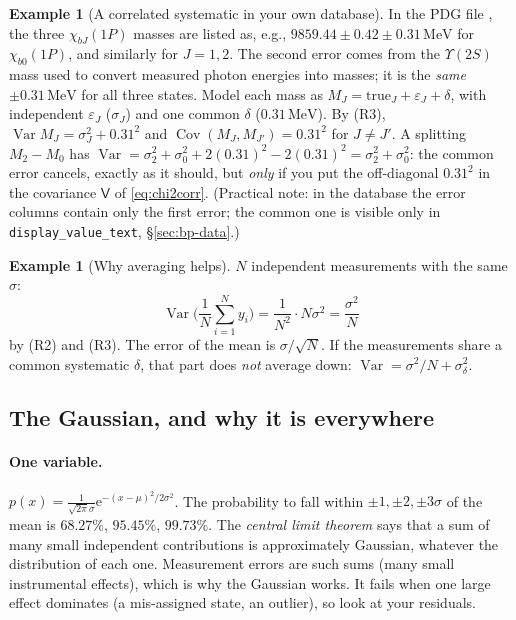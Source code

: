 \documentclass[11pt,a4paper]{article}
\numberwithin{equation}{section}
\theoremstyle{definition}
\newtheorem{example}[definition]{Example}
\theoremstyle{plain}
\theoremstyle{remark}
\numberwithin{algorithm}{section}
\newcommand{\ee}{\mathrm{e}}
\newcommand{\MeV}{\,\mathrm{MeV}}
\newcommand{\sV}{\mathsf V}
\begin{document}
\begin{example}[A correlated systematic in your own database]\label{ex:chib}
In the PDG file , the three $\chi_{bJ}(1P)$ masses are listed as, e.g., $9859.44\pm0.42\pm0.31\MeV$ for $\chi_{b0}(1P)$, and similarly for $J=1,2$. The second error comes from the $\Upsilon(2S)$ mass used to convert measured photon energies into masses; it is the \emph{same} $\pm0.31\MeV$ for all three states. Model each mass as $M_J=\text{true}_J+\varepsilon_J+\delta$, with independent $\varepsilon_J$ ($\sigma_J$) and one common $\delta$ ($0.31\MeV$). By (R3), $\operatorname{Var}M_J=\sigma_J^2+0.31^2$ and $\operatorname{Cov}(M_J,M_{J'})=0.31^2$ for $J\ne J'$. A splitting $M_2-M_0$ has $\operatorname{Var}=\sigma_2^2+\sigma_0^2+2(0.31)^2-2(0.31)^2=\sigma_2^2+\sigma_0^2$: the common error cancels, exactly as it should, but \emph{only} if you put the off-diagonal $0.31^2$ in the covariance $\sV$ of \eqref{eq:chi2corr}. (Practical note: in the database the error columns contain only the first error; the common one is visible only in \texttt{display\_value\_text}, \S\ref{sec:bp-data}.)
\end{example}

\begin{example}[Why averaging helps]
$N$ independent measurements with the same $\sigma$:
\[
\operatorname{Var}\Big(\frac1N\sum_{i=1}^N y_i\Big)=\frac1{N^2}\cdot N\sigma^2=\frac{\sigma^2}{N}
\]
by (R2) and (R3). The error of the mean is $\sigma/\sqrt N$. If the measurements share a common systematic $\delta$, that part does \emph{not} average down: $\operatorname{Var}=\sigma^2/N+\sigma_\delta^2$.
\end{example}

\subsection{The Gaussian, and why it is everywhere}\label{sec:pr-gauss}
\paragraph{One variable.} $p(x)=\frac{1}{\sqrt{2\pi}\sigma}\ee^{-(x-\mu)^2/2\sigma^2}$. The probability to fall within $\pm1,\pm2,\pm3\sigma$ of the mean is $68.27\%$, $95.45\%$, $99.73\%$. The \emph{central limit theorem} says that a sum of many small independent contributions is approximately Gaussian, whatever the distribution of each one. Measurement errors are such sums (many small instrumental effects), which is why the Gaussian works. It fails when one large effect dominates (a mis-assigned state, an outlier), so look at your residuals.
\end{document}

